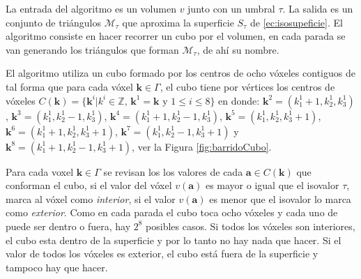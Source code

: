 La entrada del algoritmo es un volumen $v$ junto con un umbral $\tau$. La salida es un conjunto de triángulos $\mathcal{M}_{\tau}$ que aproxima la superficie $S_{\tau}$ de \eqref{ec:isosupeficie}. El algoritmo consiste en hacer recorrer un cubo por el volumen, en cada parada se van generando los triángulos que forman $\mathcal{M}_{\tau}$, de ahí su nombre.

El algoritmo utiliza un cubo formado por los centros de ocho vóxeles contiguos de tal forma que para cada vóxel $\textbf{k} \in \Gamma$, el cubo tiene por vértices los centros de vóxeles $C(\textbf{k}) = \{ \textbf{k}^i | k^i \in \mathbb{Z} \text{, } \textbf{k}^1 = \textbf{k} \text{ y } 1 \leq i \leq 8 \}$ en donde: $\textbf{k}^{2} = (k_{1}^{1} + 1, k_{2}^{1}, k_{3}^{1})$, $\textbf{k}^{3} = (k_{1}^{1}, k_{2}^{1} - 1, k_{3}^{1})$, $\textbf{k}^{4} = (k_{1}^{1} + 1, k_{2}^{1} - 1, k_{3}^{1})$, $\textbf{k}^{5} = (k_{1}^{1}, k_{2}^{1}, k_{3}^{1} + 1)$, $\textbf{k}^{6} = (k_{1}^{1} + 1, k_{2}^{1}, k_{3}^{1} + 1)$, $\textbf{k}^{7} = (k_{1}^{1}, k_{2}^{1} - 1, k_{3}^{1} + 1)$ y $\textbf{k}^{8} = (k_{1}^{1} + 1, k_{2}^{1} - 1, k_{3}^{1} + 1)$, ver la Figura \ref{fig:barridoCubo}. 

Para cada voxel $\textbf{k} \in \Gamma$ se revisan los los valores de cada $\textbf{a} \in C(\textbf{k})$ que conforman el cubo, si el valor del vóxel $v(\textbf{a})$ es mayor o igual que el isovalor $\tau$, marca al vóxel como \emph{interior}, si el valor $v(\textbf{a})$ es menor que el isovalor lo marca como \emph{exterior}. Como en cada parada el cubo toca ocho vóxeles y cada uno de puede ser dentro o fuera, hay $2^8$ posibles casos. Si todos los vóxeles son interiores, el cubo esta dentro de la superficie y por lo tanto no hay nada que hacer. Si el valor de todos los vóxeles es exterior, el cubo está fuera de la superficie y tampoco hay que hacer.

